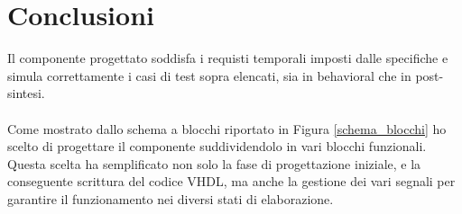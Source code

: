 \documentclass[10pt]{article}
\begin{document}
	\section{Conclusioni}
	Il componente progettato soddisfa i requisti temporali imposti dalle specifiche e simula correttamente i casi di test sopra elencati, sia in behavioral che in post-sintesi. 
	\paragraph{}
	Come mostrato dallo schema a blocchi riportato in Figura \ref{schema_blocchi} ho scelto di progettare il componente suddividendolo in vari blocchi funzionali. Questa scelta ha semplificato non solo la fase di progettazione iniziale, e la conseguente scrittura del codice VHDL, ma anche la gestione dei vari segnali per garantire il funzionamento nei diversi stati di elaborazione.
\end{document}
